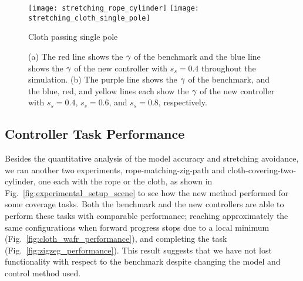 \begin{figure}[t]
    \centering
    \texttt{[image: stretching\_rope\_cylinder]} \hfill
    \texttt{[image: stretching\_cloth\_single\_pole]}%
    \caption{Cloth passing single pole}
    \label{Fig: stretching factor scene_cloth_single_pole}
    \caption{(a) The red line shows the $\gamma$ of the benchmark and the blue line shows the $\gamma$ of the new controller with $s_s = 0.4$ throughout the simulation. (b) The purple line shows the $\gamma$ of the benchmark, and the blue, red, and yellow lines each show the $\gamma$ of the new controller with $s_s = 0.4$, $s_s = 0.6$, and $s_s = 0.8$, respectively.}
    \label{fig:experiment_stretching_factorFig: experiment_stretching_factor}
\end{figure}









\subsection{Controller Task Performance} \label{Results:Controller Task Performance}

Besides the quantitative analysis of the model accuracy and stretching avoidance, we ran another two experiments, rope-matching-zig-path and cloth-covering-two-cylinder, one each with the rope or the cloth, as shown in Fig.~\ref{fig:experimental_setup_scene} to see how the new method performed for some coverage tasks. Both the benchmark and the new controllers are able to perform these tasks with comparable performance; reaching approximately the same configurations when forward progress stops due to a local minimum (Fig.~\ref{fig:cloth_wafr_performance}), and completing the task (Fig.~\ref{fig:zigzeg_performance}). This result suggests that we have not lost functionality with respect to the benchmark despite changing the model and control method used.


